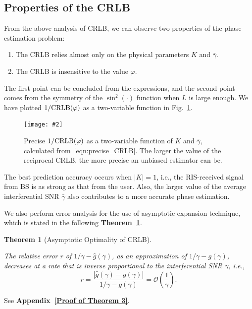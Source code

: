 \documentclass[journal,twocolumn]{IEEEtran}
\newtheorem{theorem}{\bf Theorem}
\theoremstyle{nonumberplain}
\newcommand{\myincludegraphics}[2][width=1\linewidth]{\texttt{[image: \#2]}}
\newcommand{\myincludegraphics}[2][width=0.8\linewidth]{\texttt{[image: \#2]}}
\begin{document}
\subsection{Properties of the CRLB} \label{Properties of the CRLB}
    From the above analysis of CRLB, we can observe two properties of the phase estimation problem:
    \begin{enumerate}
        \item The CRLB relies almost only on the physical parameters $K$ and $\bar{\gamma}$.
        \item The CRLB is insensitive to the value $\varphi$.
    \end{enumerate}
    The first point can be concluded from the expressions, and the second point comes from the symmetry of the $\sin^2(\cdot)$ function when $L$ is large enough. 
    We have plotted $1/{\rm CRLB}(\varphi)$ as a two-variable function in Fig.~\ref{fig:CRLB two variable}. 
    \begin{figure}[!t]
        \centering
        \myincludegraphics{data/CRLB.pdf}
        \caption{Precise $1/{\rm CRLB}(\varphi)$ as a two-variable function of $K$ and $\bar{\gamma}$, calculated from~\eqref{eqn:precise_CRLB}. The larger the value of the reciprocal CRLB, the more precise an unbiased estimator can be. }
        \label{fig:CRLB two variable}
    \end{figure}
    The best prediction accuracy occurs when $\lvert K \rvert = 1$, i.e., the RIS-received signal from BS is as strong as that from the user. 
    Also, the larger value of the average interferential SNR $\bar{\gamma}$ also contributes to a more accurate phase estimation. 

We also perform error analysis for the use of asymptotic expansion technique, which is stated in the following {\bf Theorem~\ref{thm:CRLB_asym_error_analysis}}. 

    \begin{theorem}[Asymptotic Optimality of CRLB] \label{thm:CRLB_asym_error_analysis}\mbox{}\par
        The relative error $r$ of $1/\gamma - \hat{g}(\gamma)$, as an approximation of $1/\gamma - g(\gamma)$, decreases at a rate that is inverse proportional to the interferential SNR $\gamma$, i.e.,
        \begin{equation}
            r=\frac{\left|\hat{g}(\gamma)-g(\gamma)\right|}{1/\gamma - g(\gamma)} = \mathcal{O}\left(\frac{1}{\gamma}\right).
        \end{equation}
    \end{theorem}
    \begin{IEEEproof}
        See {\bf Appendix~\ref{Proof of Theorem 3}}. 
    \end{IEEEproof}
\end{document}
